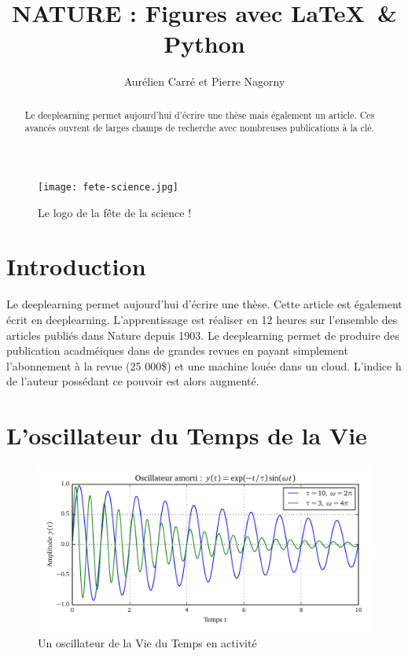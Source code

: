 \documentclass[10pt,a4paper]{article}
\title{NATURE : Figures avec \LaTeX \ \& Python}
\author{Aurélien Carré \protect\footnotemark{} et Pierre Nagorny\footnotemark{}}
\begin{document}
\maketitle

\begin{figure}[h]
\begin{center}
\texttt{[image: fete-science.jpg]}
\caption{Le logo de la fête de la science !}
\end{center}
\end{figure}

\begin{abstract}
    Le deeplearning permet aujourd'hui d'écrire une thèse mais également un article. Ces avancés ouvrent de larges champs de recherche avec nombreuses publications à la clé.
\end{abstract}

\section{Introduction}
Le deeplearning permet aujourd'hui d'écrire une thèse. Cette article est également écrit en deeplearning.
L'apprentissage est réaliser en 12 heures sur l'ensemble des articles publiés dans Nature depuis 1903.
Le deeplearning permet de produire des publication acadméiques dans de grandes revues en payant simplement l'abonnement à la revue (25 000\$) et une machine louée dans un cloud. L'indice h de l'auteur possédant ce pouvoir est alors augmenté.



\section{L'oscillateur du Temps de la Vie}
\begin{figure}[h]
\begin{center}
\includegraphics{Oscillateur}
\end{center}
\caption{Un oscillateur de la Vie du Temps en activité}
\end{figure}
\end{document}
